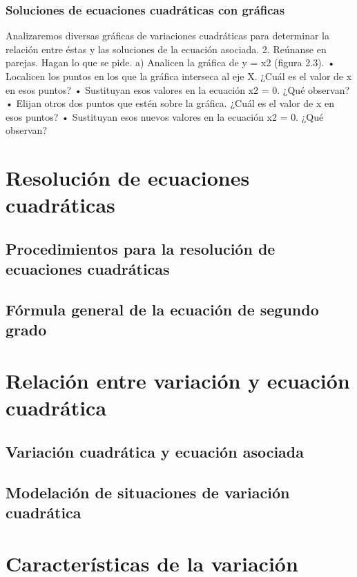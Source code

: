 \documentclass[11pt]{book}
\begin{document}
\subsubsection{Soluciones de ecuaciones cuadráticas con gráficas}
Analizaremos diversas gráficas de variaciones cuadráticas para determinar
la relación entre éstas y las soluciones de la ecuación asociada.
2. Reúnanse en parejas. Hagan lo que se pide.
a) Analicen la gráfica de y = x2
(figura 2.3).
• Localicen los puntos en los que la gráfica interseca al eje X. ¿Cuál
es el valor de x en esos puntos?
• Sustituyan esos valores en la ecuación x2
= 0. ¿Qué observan?
• Elijan otros dos puntos que estén sobre la gráfica. ¿Cuál es el valor
de x en esos puntos?
• Sustituyan esos nuevos valores en la ecuación x2
= 0. ¿Qué observan?





\newpage \thispagestyle{plain}
\section{Resolución de ecuaciones cuadráticas}
\subsection{Procedimientos para la resolución de ecuaciones cuadráticas}
\subsection{Fórmula general de la ecuación de segundo grado}

\newpage \thispagestyle{plain}
\section{Relación entre variación y ecuación cuadrática}
\subsection{Variación cuadrática y ecuación asociada}
\subsection{Modelación de situaciones de variación cuadrática}

\newpage \thispagestyle{plain}
\section{Características de la variación}
\end{document}
